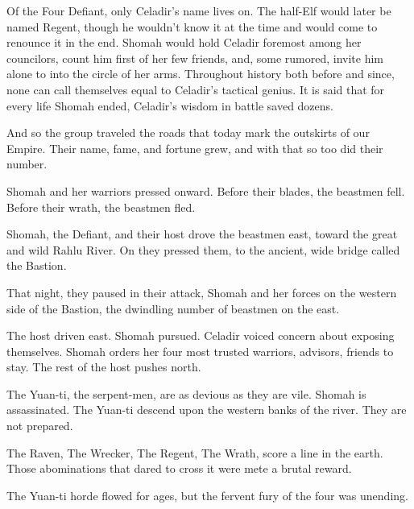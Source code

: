 Of the Four Defiant, only Celadir's name lives on.
The half-Elf would later be named Regent, though he wouldn't know it at the time
  and would come to renounce it in the end.
Shomah would hold Celadir foremost among her councilors,
  count him first of her few friends,
  and, some rumored, invite him alone to into the circle of her arms.
Throughout history both before and since, none can call themselves equal
  to Celadir's tactical genius.
It is said that for every life Shomah ended, Celadir's wisdom in battle saved dozens.

\hrulefill

And so the group traveled the roads that today mark the outskirts of our Empire.
Their name, fame, and fortune grew, and with that so too did their number.

Shomah and her warriors pressed onward.
Before their blades, the beastmen fell.
Before their wrath, the beastmen fled.

Shomah, the Defiant, and their host drove the beastmen east,
  toward the great and wild Rahlu River.
On they pressed them, to the ancient, wide bridge called the Bastion.

That night, they paused in their attack, Shomah and her forces on the western side of the Bastion,
  the dwindling number of beastmen on the east.



The host driven east.
Shomah pursued.
Celadir voiced concern about exposing themselves.
Shomah orders her four most trusted warriors, advisors, friends to stay.
The rest of the host pushes north.

The Yuan-ti, the serpent-men, are as devious as they are vile.
Shomah is assassinated.
The Yuan-ti descend upon the western banks of the river.
They are not prepared.

The Raven, The Wrecker, The Regent, The Wrath, score a line in the earth.
Those abominations that dared to cross it were mete a brutal reward.

The Yuan-ti horde flowed for ages, but the fervent fury of the four was unending.
